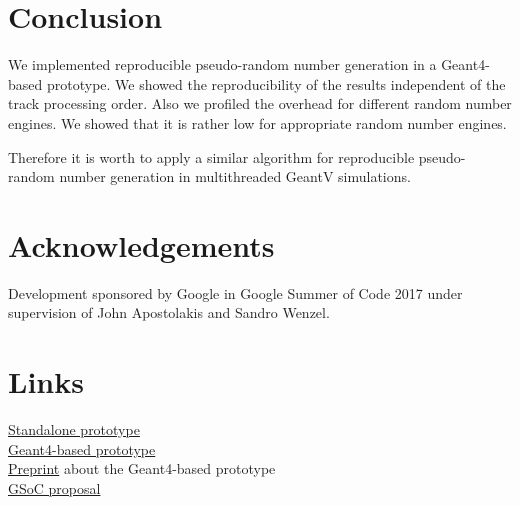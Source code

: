 \documentclass[a4paper, 12pt]{article} %
\begin{document}
 \section*{ Conclusion }
 
  We implemented reproducible pseudo-random number generation in a Geant4-based prototype.
  We showed the reproducibility of the results independent of the track processing order.
  Also we profiled the overhead for different random number engines.
  We showed that it is rather low for appropriate random number engines.
  
  Therefore it is worth to apply a similar algorithm for reproducible pseudo-random number generation in multithreaded GeantV simulations.
 
 \section*{ Acknowledgements }
 
  Development sponsored by Google in Google Summer of Code 2017 under supervision of John Apostolakis and Sandro Wenzel.
 
 \section*{ Links }
 
  \href{https://bitbucket.org/sd57/pedigree-git}{Standalone prototype}\\
  \href{https://bitbucket.org/sd57/geant4/branch/pedigree}{Geant4-based prototype}\\
  \href{https://sd57.github.io/g4dprng/gsocPreprint.html}{Preprint} about the Geant4-based prototype\\
  \href{https://sd57.github.io/g4dprng/gsoc-proposal-Savin.html}{GSoC proposal}\\
  
%  
%  
 
\end{document}
